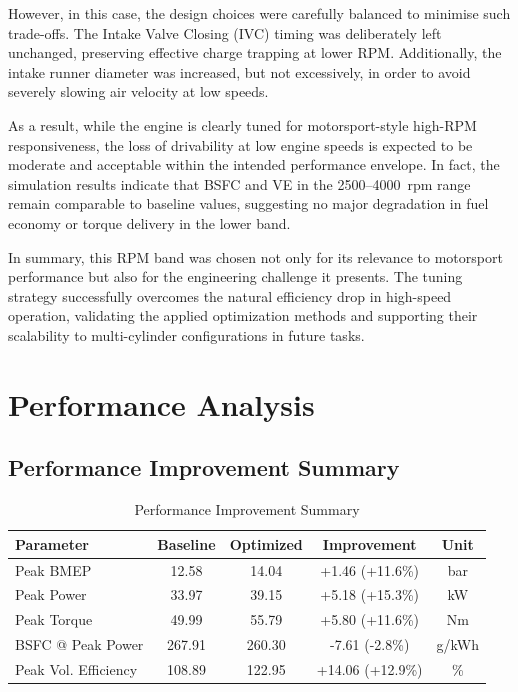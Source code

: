 However, in this case, the design choices were carefully balanced to minimise such trade-offs. The Intake Valve Closing (IVC) timing was deliberately left unchanged, preserving effective charge trapping at lower RPM. Additionally, the intake runner diameter was increased, but not excessively, in order to avoid severely slowing air velocity at low speeds. 

As a result, while the engine is clearly tuned for motorsport-style high-RPM responsiveness, the loss of drivability at low engine speeds is expected to be moderate and acceptable within the intended performance envelope. In fact, the simulation results indicate that BSFC and VE in the 2500--4000~rpm range remain comparable to baseline values, suggesting no major degradation in fuel economy or torque delivery in the lower band.

In summary, this RPM band was chosen not only for its relevance to motorsport performance but also for the engineering challenge it presents. The tuning strategy successfully overcomes the natural efficiency drop in high-speed operation, validating the applied optimization methods and supporting their scalability to multi-cylinder configurations in future tasks.

\section{Performance Analysis}

\subsection{Performance Improvement Summary}

\begin{table}[H]
    \centering
    \caption{Performance Improvement Summary}
    \label{tab:task1_improvements}
    \begin{tabular}{lcccc}
        \toprule
        Parameter & \textcolor{baselinecolor}{Baseline} & \textcolor{optimizedcolor}{Optimized} & Improvement & Unit \\
        \midrule
        Peak BMEP & \textcolor{baselinecolor}{12.58} & \textcolor{optimizedcolor}{14.04} & \textcolor{improvementcolor}{+1.46 (+11.6\%)} & bar \\
        Peak Power & \textcolor{baselinecolor}{33.97} & \textcolor{optimizedcolor}{39.15} & \textcolor{improvementcolor}{+5.18 (+15.3\%)} & kW \\
        Peak Torque & \textcolor{baselinecolor}{49.99} & \textcolor{optimizedcolor}{55.79} & \textcolor{improvementcolor}{+5.80 (+11.6\%)} & Nm \\
        BSFC @ Peak Power & \textcolor{baselinecolor}{267.91} & \textcolor{optimizedcolor}{260.30} & \textcolor{improvementcolor}{-7.61 (-2.8\%)} & g/kWh \\
        Peak Vol. Efficiency & \textcolor{baselinecolor}{108.89} & \textcolor{optimizedcolor}{122.95} & \textcolor{improvementcolor}{+14.06 (+12.9\%)} & \% \\
        \bottomrule
    \end{tabular}
\end{table}


